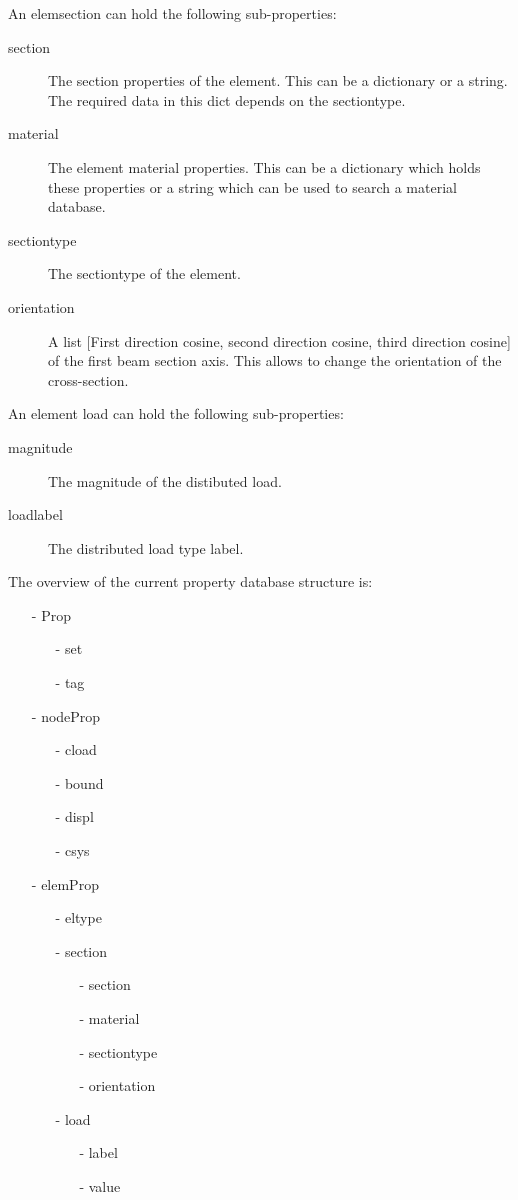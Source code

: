 {{{An elemsection can hold the following sub-properties:
\begin{description}
\item [section] The section properties of the element. This can be a dictionary or a string. The required data in this dict depends on the sectiontype. 
\item [material] The element material properties. This can be a dictionary which holds these properties or a string which can be used to search a material database. 
\item [sectiontype] The sectiontype of the element. 
\item [orientation]  A list [First direction cosine, second direction cosine, third direction cosine] of the first beam section axis. This allows to change the orientation of the cross-section.
\end{description}

An element load can hold the following sub-properties:
\begin{description}
\item [magnitude] The magnitude of the distibuted load.
\item [loadlabel] The distributed load type label.
\end{description}

The overview of the current property database structure is:
\begin{itemize}
\item[-] Prop
    \begin{itemize}
    \item[-] set
    \item[-] tag
    \end{itemize}
\item[-] nodeProp
    \begin{itemize}
    \item[-] cload
    \item[-] bound
    \item[-] displ
    \item[-] csys
    \end{itemize}
\item[-] elemProp 
    \begin{itemize}
    \item[-] eltype
    \item[-] section
        \begin{itemize}
        \item[-] section
        \item[-] material
        \item[-] sectiontype
        \item[-] orientation
        \end{itemize}
    \item[-] load
        \begin{itemize}
        \item[-] label
        \item[-] value
        \end{itemize}
    \end{itemize}
\end{itemize}

}}}
